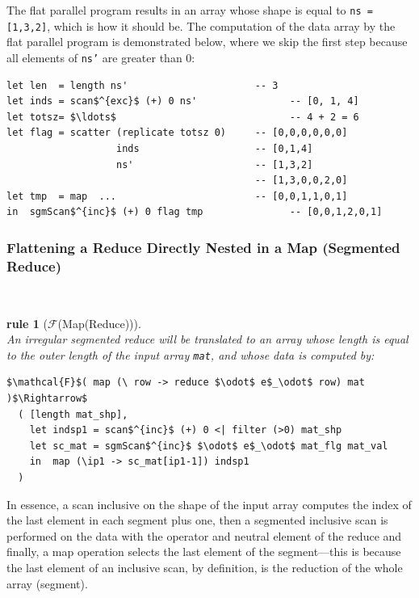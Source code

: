 \documentclass[acmsmall,review]{acmart}\settopmatter{printfolios=true,printccs=false,printacmref=false}
\newtheorem{rewrite}{rule}
\begin{document}
The flat parallel program results in an array whose shape is 
equal to {\tt ns = [1,3,2]}, which is how it should be.
The computation of the data array by the flat parallel program is
demonstrated below, where we skip the first step because all elements
of {\tt ns'} are greater than $0$:
\begin{lstlisting}[mathescape=true]
let len  = length ns'                      -- 3
let inds = scan$^{exc}$ (+) 0 ns'                -- [0, 1, 4]
let totsz= $\ldots$                              -- 4 + 2 = 6 
let flag = scatter (replicate totsz 0)     -- [0,0,0,0,0,0]
                   inds                    -- [0,1,4]
                   ns'                     -- [1,3,2]
                                           -- [1,3,0,0,2,0]
let tmp  = map  ...                        -- [0,0,1,1,0,1]
in  sgmScan$^{inc}$ (+) 0 flag tmp               -- [0,0,1,2,0,1]
\end{lstlisting}\vspace{-2ex}

\subsubsection{Flattening a Reduce Directly Nested in a Map (Segmented Reduce)}
\label{subsubsec:red-in-map}
$\mbox{ }$\\

\begin{rewrite}[$\mathcal{F}$(Map(Reduce))]\label{Flat-Red-In-Map}
$\mbox{ }$\\
An irregular segmented reduce will be translated to an array whose
length is equal to the outer length of the input array {\tt mat}, and
whose data is computed by: 
\begin{lstlisting}[mathescape=true]
$\mathcal{F}$( map (\ row -> reduce $\odot$ e$_\odot$ row) mat )$\Rightarrow$
  ( [length mat_shp],
    let indsp1 = scan$^{inc}$ (+) 0 <| filter (>0) mat_shp
    let sc_mat = sgmScan$^{inc}$ $\odot$ e$_\odot$ mat_flg mat_val
    in  map (\ip1 -> sc_mat[ip1-1]) indsp1
  )
\end{lstlisting}\vspace{-2ex}
\end{rewrite}

In essence, a scan inclusive on the shape of the input array computes
the index of the last element in each segment plus one, then a segmented
inclusive scan is performed on the data with the operator and neutral
element of the reduce and finally, a map operation selects the last
element of the segment---this is because the last element of an inclusive
scan, by definition, is the reduction of the whole array (segment). 
\end{document}

